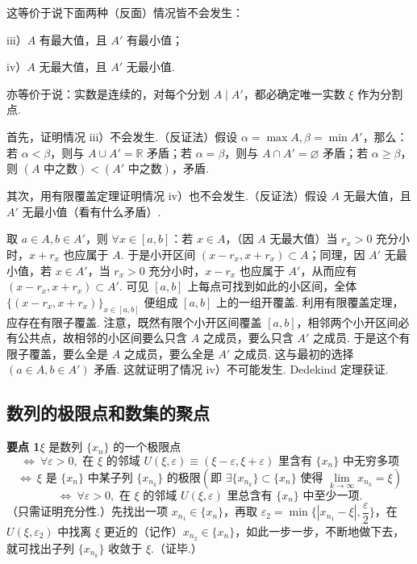 \documentclass[UTF8, 12pt, fontset=fandol, oneside]{ctexart}
\begin{document}
这等价于说下面两种（反面）情况皆不会发生：

iii）$A$ 有最大值，且 $A'$ 有最小值；

iv）$A$ 无最大值，且 $A'$ 无最小值.

亦等价于说：实数是连续的，对每个分划 $A\mid A'$，都必确定唯一实数 $\xi$ 作为分割点.

首先，证明情况 iii）不会发生.（反证法）假设 $\alpha=\max A,\beta=\min A'$，那么：若 $\alpha<\beta$，则与 $A\cup A'=\mathbb{R}$ 矛盾；若 $\alpha=\beta$，则与 $A\cap A'=\varnothing$ 矛盾；若 $\alpha\ge\beta$，则 $(A\text{ 中之数})<(A'\text{ 中之数})$，矛盾.

其次，用有限覆盖定理证明情况 iv）也不会发生.（反证法）假设 $A$ 无最大值，且 $A'$ 无最小值（看有什么矛盾）.

取 $a\in A,b\in A'$，则 $\forall x\in[a,b]$：若 $x\in A$，（因 $A$ 无最大值）当 $r_x>0$ 充分小时，$x+r_x$ 也应属于 $A$. 于是小开区间 $(x-r_x,x+r_x)\subset A$；同理，因 $A'$ 无最小值，若 $x\in A'$，当 $r_x>0$ 充分小时，$x-r_x$ 也应属于 $A'$，从而应有 $(x-r_x,x+r_x)\subset A'$. 可见 $[a,b]$ 上每点可找到如此的小区间，全体 $\{(x-r_x,x+r_x)\}_{x\in[a,b]}$ 便组成 $[a,b]$ 上的一组开覆盖. 利用有限覆盖定理，应存在有限子覆盖. 注意，既然有限个小开区间覆盖 $[a,b]$，相邻两个小开区间必有公共点，故相邻的小区间要么只含 $A$ 之成员，要么只含 $A'$ 之成员. 于是这个有限子覆盖，要么全是 $A$ 之成员，要么全是 $A'$ 之成员. 这与最初的选择 $(a\in A,b\in A')$ 矛盾. 这就证明了情况 iv）不可能发生. Dedekind 定理获证.

\subsection*{数列的极限点和数集的聚点}

\noindent\textbf{要点 1}\quad $\xi$ 是数列 $\{x_n\}$ 的一个极限点
\[
\Longleftrightarrow\ \forall \varepsilon>0,\text{ 在 }\xi\text{ 的邻域 }U(\xi,\varepsilon)\equiv(\xi-\varepsilon,\xi+\varepsilon)\text{ 里含有 }\{x_n\}\text{ 中无穷多项}
\]
\[
\Longleftrightarrow\ \xi\text{ 是 }\{x_n\}\text{ 中某子列 }\{x_{n_k}\}\text{ 的极限}\left(\text{即 }\exists\{x_{n_k}\}\subset\{x_n\}\text{ 使得 }\lim_{k\to\infty}x_{n_k}=\xi\right)
\]
\[
\Longleftrightarrow\ \forall \varepsilon>0,\text{ 在 }\xi\text{ 的邻域 }U(\xi,\varepsilon)\text{ 里总含有 }\{x_n\}\text{ 中至少一项}.
\]
（只需证明充分性.）先找出一项 $x_{n_1}\in\{x_n\}$，再取 $\varepsilon_2=\min\{|x_{n_1}-\xi|,\dfrac\varepsilon2\}$，在 $U(\xi,\varepsilon_2)$ 中找离 $\xi$ 更近的（记作）$x_{n_2}\in\{x_n\}$，如此一步一步，不断地做下去，就可找出子列 $\{x_{n_k}\}$ 收敛于 $\xi$.（证毕.）
\end{document}
